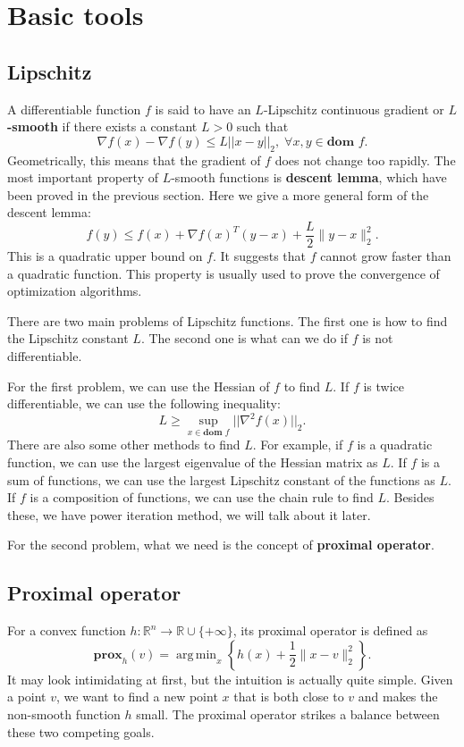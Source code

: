 \documentclass[lang=en,color=blue,mode=fancy,titlestyle=hang]{elegantbook}
\DeclareMathOperator*{\argmin}{arg\,min}
\begin{document}
\section{Basic tools}
\subsection{Lipschitz}
A differentiable function $f$ is said to have an $L$-Lipschitz continuous gradient or
\textbf{$L$-smooth} if there exists a constant $L > 0$ such that
\[
\nabla f(x) - \nabla f(y) \leq L ||x - y||_2, \; \forall x, y \in \textbf{dom } f.
\]
Geometrically, this means that the gradient of $f$ does not change too rapidly.
The most important property of $L$-smooth functions is \textbf{descent lemma}, which have been
proved in the previous section. Here we give a more general form of the descent lemma:
\[
f(y) \le f(x) + \nabla f(x)^T (y-x) + \frac{L}{2} \|y-x\|_2^2.
\]
This is a quadratic upper bound on $f$. It suggests that $f$ cannot grow faster than a
quadratic function. This property is usually used to prove the convergence of optimization algorithms.

There are two main problems of Lipschitz functions. The first one is how to find the Lipschitz
constant $L$. The second one is what can we do if $f$ is not differentiable.

For the first problem, we can use the Hessian of $f$ to find $L$. If $f$ is twice differentiable,
we can use the following inequality:
\[
L \geq \sup_{x \in \textbf{dom } f} ||\nabla^2 f(x)||_2.
\]
There are also some other methods to find $L$. For example, if $f$ is a quadratic function, we can
use the largest eigenvalue of the Hessian matrix as $L$. If $f$ is a sum of functions, we can use the
largest Lipschitz constant of the functions as $L$. If $f$ is a composition of functions, we can use
the chain rule to find $L$. Besides these, we have power iteration method, we will talk about it later.

For the second problem, what we need is the concept of \textbf{proximal operator}.

\subsection{Proximal operator}
For a convex function $h: \mathbb{R}^n \to \mathbb{R} \cup \{+\infty\}$, its proximal operator is defined as
\[
\mathbf{prox}_h(v) = \argmin_{x} \left\{ h(x) + \frac{1}{2} \|x - v\|_2^2 \right\}.
\]
It may look intimidating at first, but the intuition is actually quite simple. Given a point $v$,
we want to find a new point $x$ that is both close to $v$ and makes the non-smooth function $h$ small.
The proximal operator strikes a balance between these two competing goals.
\end{document}
